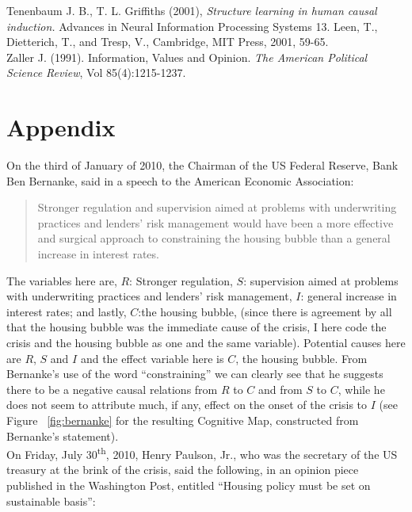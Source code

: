 \documentclass[12pt]{article}
\newcommand{\ts}{\textsuperscript}
\begin{document}
Tenenbaum J. B., T. L. Griffiths (2001), \textit{Structure learning in human causal induction.} Advances in Neural Information Processing Systems 13. Leen, T., Dietterich, T., and Tresp, V., Cambridge, MIT Press, 2001, 59-65.
\\


Zaller J. (1991). Information, Values and Opinion. \textit{The American Political Science Review}, Vol 85(4):1215-1237.


\section*{Appendix}
On the third of January of 2010, the Chairman of the US Federal Reserve, Bank Ben Bernanke, said in a speech to the American Economic Association:
\begin{quotation}
Stronger regulation and supervision aimed at problems with underwriting practices and lenders' risk management would have been a more effective and surgical approach to constraining the housing bubble than a general increase in interest rates.
\end{quotation}

The variables here are, $R$: Stronger regulation, $S$: supervision aimed at problems with underwriting practices and lenders' risk management, $I$: general increase in interest rates; and lastly, $C$:the housing bubble, (since there is agreement by all that the housing bubble was the immediate cause of the crisis, I here code the crisis and the housing bubble as one and the same variable). Potential causes here are $R$, $S$ and $I$ and the effect variable here is $C$, the housing bubble. From Bernanke's use of the word ``constraining'' we can clearly see that he suggests there to be a negative causal relations from $R$ to $C$ and from $S$ to $C$, while he does not seem to attribute much, if any, effect on the onset of the crisis to $I$ (see Figure ~\ref{fig:bernanke} for the resulting Cognitive Map, constructed from Bernanke's statement).\\

On Friday, July 30\ts{th}, 2010, Henry Paulson, Jr., who was the secretary of the US treasury at the brink of the crisis, said the following, in an opinion piece published in the Washington Post, entitled ``Housing policy must be set on sustainable basis'':
\end{document}
